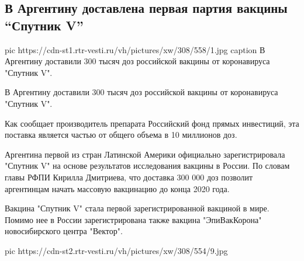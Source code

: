  
 
 
 
 
 
\subsection{В Аргентину доставлена первая партия вакцины \enquote{Спутник V}}
\label{sec:24_12_2020.news.ru.vesti.1.argentina_sputnik_v}

\ifcmt
pic https://cdn-st1.rtr-vesti.ru/vh/pictures/xw/308/558/1.jpg
caption В Аргентину доставили 300 тысяч доз российской вакцины от коронавируса "Спутник V".
\fi

В Аргентину доставили 300 тысяч доз российской вакцины от коронавируса "Спутник
V".

Как сообщает производитель препарата Российский фонд прямых инвестиций, эта
поставка является частью от общего объема в 10 миллионов доз.

Аргентина первой из стран Латинской Америки официально зарегистрировала
"Спутник V" на основе результатов исследования вакцины в России. По словам
главы РФПИ Кирилла Дмитриева, что доставка 300 000 доз позволит аргентинцам
начать массовую вакцинацию до конца 2020 года.

Вакцина "Спутник V" стала первой зарегистрированной вакциной в мире. Помимо нее
в России зарегистрирована также вакцина "ЭпиВакКорона" новосибирского центра
"Вектор".

\ifcmt
pic https://cdn-st2.rtr-vesti.ru/vh/pictures/xw/308/554/9.jpg
\fi
